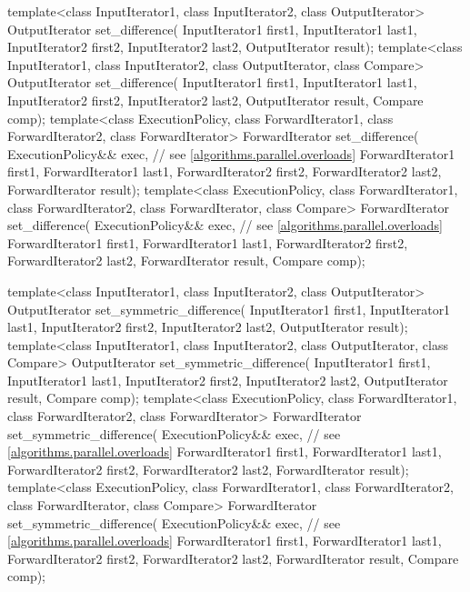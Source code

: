 \begin{codeblock}
{  template<class InputIterator1, class InputIterator2, class OutputIterator>
    OutputIterator set_difference(
      InputIterator1 first1, InputIterator1 last1,
      InputIterator2 first2, InputIterator2 last2,
      OutputIterator result);
  template<class InputIterator1, class InputIterator2, class OutputIterator, class Compare>
    OutputIterator set_difference(
      InputIterator1 first1, InputIterator1 last1,
      InputIterator2 first2, InputIterator2 last2,
      OutputIterator result, Compare comp);
  template<class ExecutionPolicy, class ForwardIterator1, class ForwardIterator2,
           class ForwardIterator>
    ForwardIterator set_difference(
      ExecutionPolicy&& exec, // see \ref{algorithms.parallel.overloads}
      ForwardIterator1 first1, ForwardIterator1 last1,
      ForwardIterator2 first2, ForwardIterator2 last2,
      ForwardIterator result);
  template<class ExecutionPolicy, class ForwardIterator1, class ForwardIterator2,
           class ForwardIterator, class Compare>
    ForwardIterator set_difference(
      ExecutionPolicy&& exec, // see \ref{algorithms.parallel.overloads}
      ForwardIterator1 first1, ForwardIterator1 last1,
      ForwardIterator2 first2, ForwardIterator2 last2,
      ForwardIterator result, Compare comp);

  template<class InputIterator1, class InputIterator2, class OutputIterator>
    OutputIterator set_symmetric_difference(
      InputIterator1 first1, InputIterator1 last1,
      InputIterator2 first2, InputIterator2 last2,
      OutputIterator result);
  template<class InputIterator1, class InputIterator2, class OutputIterator, class Compare>
    OutputIterator set_symmetric_difference(
      InputIterator1 first1, InputIterator1 last1,
      InputIterator2 first2, InputIterator2 last2,
      OutputIterator result, Compare comp);
  template<class ExecutionPolicy, class ForwardIterator1, class ForwardIterator2,
           class ForwardIterator>
    ForwardIterator set_symmetric_difference(
      ExecutionPolicy&& exec, // see \ref{algorithms.parallel.overloads}
      ForwardIterator1 first1, ForwardIterator1 last1,
      ForwardIterator2 first2, ForwardIterator2 last2,
      ForwardIterator result);
  template<class ExecutionPolicy, class ForwardIterator1, class ForwardIterator2,
           class ForwardIterator, class Compare>
    ForwardIterator set_symmetric_difference(
      ExecutionPolicy&& exec, // see \ref{algorithms.parallel.overloads}
      ForwardIterator1 first1, ForwardIterator1 last1,
      ForwardIterator2 first2, ForwardIterator2 last2,
      ForwardIterator result, Compare comp);

}
\end{codeblock}
